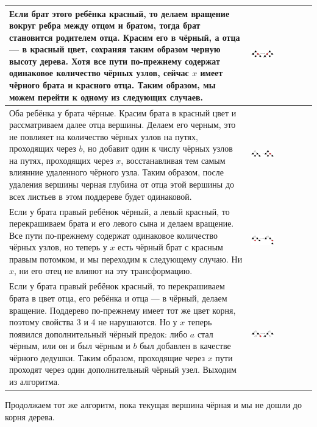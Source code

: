 \begin{center}
\begin{tabular}{|m{10cm}|m{7cm}|}
\hline
Если брат этого ребёнка красный, то делаем вращение вокруг ребра между отцом и братом, тогда брат становится родителем отца. Красим его в чёрный, а отца — в красный цвет, сохраняя таким образом черную высоту дерева.
Хотя все пути по-прежнему содержат одинаковое количество чёрных узлов, сейчас $x$ имеет чёрного брата и красного отца.
Таким образом, мы можем перейти к одному из следующих случаев.
& \includegraphics[width=0.4\textwidth]{img/3_3.png} \\ \hline
Оба ребёнка у брата чёрные.
Красим брата в красный цвет и рассматриваем далее отца вершины.
Делаем его черным, это не повлияет на количество чёрных узлов на путях, проходящих через $b$, но добавит один к числу чёрных узлов на путях, проходящих через $x$, восстанавливая тем самым влиянние удаленного чёрного узла.
Таким образом, после удаления вершины черная глубина от отца этой вершины до всех листьев в этом поддереве будет одинаковой. 
& \includegraphics[width=0.4\textwidth]{img/3_4.png} \\ \hline
Если у брата правый ребёнок чёрный, а левый красный, то перекрашиваем брата и его левого сына и делаем вращение.
Все пути по-прежнему содержат одинаковое количество чёрных узлов, но теперь у $x$ есть чёрный брат с красным правым потомком, и мы переходим к следующему случаю.
Ни $x$, ни его отец не влияют на эту трансформацию.
& \includegraphics[width=0.4\textwidth]{img/3_5.png} \\ \hline
Если у брата правый ребёнок красный, то перекрашиваем брата в цвет отца, его ребёнка и отца — в чёрный, делаем вращение.
Поддерево по-прежнему имеет тот же цвет корня, поэтому свойства 3 и 4 не нарушаются.
Но у $x$ теперь появился дополнительный чёрный предок: либо $a$ стал чёрным, или он и был чёрным и $b$ был добавлен в качестве чёрного дедушки.
Таким образом, проходящие через $x$ пути проходят через один дополнительный чёрный узел.
Выходим из алгоритма. 
& \includegraphics[width=0.4\textwidth]{img/3_6.png} \\ \hline

\end{tabular}
\end{center}

Продолжаем тот же алгоритм, пока текущая вершина чёрная и мы не дошли до корня дерева.
